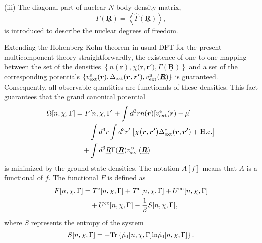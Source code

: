 (iii) The diagonal part of nuclear $N$-body density matrix,
%
\begin{equation} %
	\Gamma(\underline{\bm{R}}) = \left<\hat{\Gamma}(\underline{\bm{R}}) \right>,
\end{equation}
%
is introduced to describe the nuclear degrees of freedom.

Extending the Hohenberg-Kohn theorem in usual DFT\cite{HK1964,Mermin1965} for the present 
multicomponent theory straightforwardly, 
the existence of one-to-one mapping between the set of the densities $ \left\{ n(\bm{r}), \chi \bigl(\bm{r}, \bm{r'} \bigr), 
\Gamma(\underline{\bm{R}}) \right\}$ and a set of the corresponding potentials 
$ \left\{ v^{\rm e}_{\rm ext}(\bm{r}), \Delta_\mathrm{ext}(\bm{r}, \bm{r'}), v^{\rm n}_{\rm ext}(\underline{\bm{R}}) \right\}$
is guaranteed\cite{HK1964, Mermin1965, LudersphD}.
Consequently, all observable quantities are functionals of these densities. 
This fact guarantees that the grand canonical potential 
%
\begin{equation}  %
\begin{split}
	\label{eq:grand_pot}
	\Omega[n, \chi, \Gamma] &= F[n, \chi, \Gamma] + \int d^3r n(\bm{r})[v^{\rm e}_{\rm ext}(\bm{r}) - \mu] \\
	                                    &\quad- \int d^3r \int d^3r' \left[\chi \bigl(\bm{r}, \bm{r'} \bigr)
	                                       \Delta^{\ast}_\mathrm{ext}(\bm{r}, \bm{r'}) + {\rm H.c.} \right]\\
	                     &\quad+ \int d^3\underline{R} \Gamma(\underline{\bm{R}})v^{\rm n}_{\rm ext}(\underline{\bm{R}})
\end{split}
\end{equation}
%
is minimized by the ground state densities. The notation $A[f]$ means that $A$ is a functional of $f$.
The functional $F$ is defined as
%
\begin{equation} %
\label{eq:Free_int}
\begin{split}
	F[n, \chi, \Gamma] &= T^{\rm e}[n, \chi, \Gamma] + T^{\rm n}[n, \chi, \Gamma] + U^{\rm en}[n, \chi, \Gamma] \\
	                                  &\quad + U^{\rm ee}[n, \chi, \Gamma] - \frac{1}{\beta}S[n, \chi, \Gamma],
\end{split}
\end{equation}
%
where $S$ represents the entropy of the system
%
\begin{equation}
	S[n, \chi, \Gamma] = -{\rm Tr}\left\{\hat{\rho}_0 [n, \chi, \Gamma]{\rm ln}\hat{\rho}_0 [n, \chi, \Gamma] \right\}.
\end{equation}
%

